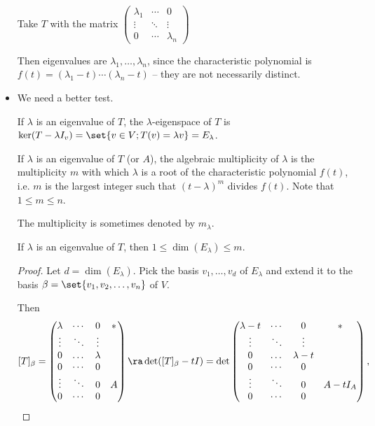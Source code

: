 \documentclass[11pt]{scrartcl}
\begin{document}
\begin{itemize}
\begin{example}
    Take \(T\) with the matrix \(\begin{pmatrix}
      \lambda_{1} & \cdots & 0\\
      \vdots & \ddots & \vdots\\
      0& \cdots & \lambda_{n}
    \end{pmatrix}\)

    Then eigenvalues are \(\lambda_{1}, \dots, \lambda_{n}\), since the
    characteristic polynomial is
    \(f(t) = (\lambda_{1} - t)\cdots(\lambda_{n} - t)\) -- they are
    not necessarily distinct.
  \end{example}
\item We need a better test.
  \begin{definition}
    If \(\lambda\) is an eigenvalue of \(T\), the
    \(\lambda\)-eigenspace of \(T\) is
    \(\ker(T-\lambda I_{v}) = \set{v\in V; T(v) = \lambda v} = E_{\lambda}\).
  \end{definition}

  \begin{definition}
    If \(\lambda\) is an eigenvalue of \(T\) (or \(A\)), the algebraic
    multiplicity of \(\lambda\) is the multiplicity \(m\) with which
    \(\lambda\) is a root of the characteristic polynomial \(f(t)\),
    i.e. \(m\) is the largest integer such that \((t-\lambda)^{m}\)
    divides \(f(t)\). Note that \(1\leq m \leq n\).

    The multiplicity is sometimes denoted by \(m_{\lambda}\).
  \end{definition}

  \begin{theorem}
    If \(\lambda\) is an eigenvalue of \(T\), then \(1\leq \dim(E_{\lambda})\leq m\).
  \end{theorem}

  \begin{proof}
    Let \(d = \dim(E_{\lambda})\). Pick the basis
    \(v_{1}, \dots, v_{d}\) of \(E_{\lambda}\) and extend it to the
    basis \(\beta=\set{v_{1}, v_{2}, \dots, v_{n}}\) of \(V\).

    Then
\[
  [T]_{\beta} = \begin{pmatrix}
    \lambda &\cdots & 0 & *\\
    \vdots &\ddots & \vdots & \\
    0&\dots&\lambda & \\
    0 &\cdots&0& \\
    \vdots &\ddots &0 & A\\
    0 & \cdots & 0 &
  \end{pmatrix} \ra \det([T]_{\beta} - tI) = \det \begin{pmatrix}
    \lambda-t &\cdots & 0 & *\\
    \vdots &\ddots & \vdots & \\
    0&\dots&\lambda-t & \\
    0 &\cdots&0& \\
    \vdots &\ddots &0 & A-tI_{A}\\
    0 & \cdots & 0 &
  \end{pmatrix},    \]


\end{proof}
\end{itemize}
\end{document}
